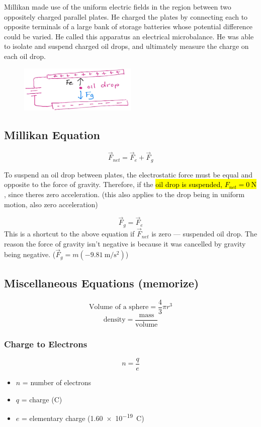 \documentclass[a4paper,12pt]{article}
\begin{document}
Millikan made use of the uniform electric fields in the region between two oppositely charged parallel plates. He charged the plates by connecting each to opposite terminals of a large bank of storage batteries whose potential difference could be varied. He called this apparatus an electrical microbalance. He was able to isolate and suspend charged oil drops, and ultimately measure the charge on each oil drop.

\begin{figure}[H]
    \centering
    \includegraphics[width=0.50\textwidth]{oil}
\end{figure}
\subsection{Millikan Equation}
\Large $$\vec{F}_{net} = \vec{F}_e + \vec{F}_g$$ \normalsize

To suspend an oil drop between plates, the electrostatic force must be equal and opposite to the force of gravity. Therefore, if the \hl{oil drop is suspended, $F_{net} = \SI{0}{\newton}$}, since theres zero acceleration. (this also applies to the drop being in uniform motion, also zero acceleration)

\Large $$\vec{F}_g = \vec{F}_e$$ \normalsize
This is a shortcut to the above equation if $\vec{F}_{net}$ is zero --- suspended oil drop. The reason the force of gravity isn't negative is because it was cancelled by gravity being negative. ($\vec{F}_g = m(\SI{-9.81}{\m\per\s\squared})$)

\subsection{Miscellaneous Equations (memorize)}
$$\textrm{Volume of a sphere} = \frac{4}{3}\pi r^3$$
$$\textrm{density} = \frac{\textrm{mass}}{\textrm{volume}}$$

\subsubsection{Charge to Electrons}
\Large$$n = \frac{q}{e}$$\normalsize
\begin{itemize}
    \item{$n$ = number of electrons}
    \item{$q$ = charge (\si{\coulomb})}
    \item{$e$ = elementary charge (\SI{1.60e-19}{\coulomb})}
\end{itemize}
\end{document}
